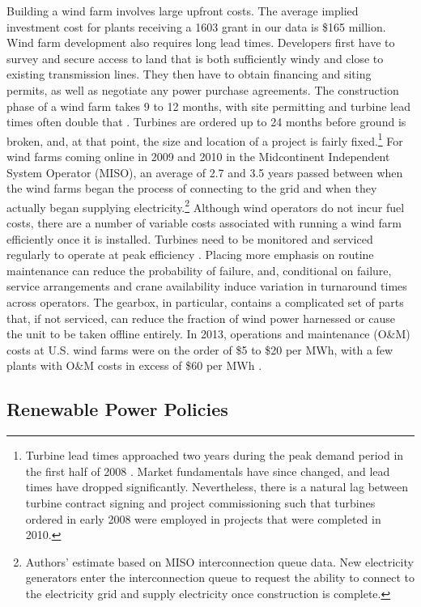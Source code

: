 \documentclass[12pt]{article}
\begin{document}
Building a wind farm involves large upfront costs. The average implied investment cost for plants receiving a 1603 grant in our data is \$165 million. Wind farm development also requires long lead times. Developers first have to survey and secure access to land that is both sufficiently windy and close to existing transmission lines. They then have to obtain financing and siting permits, as well as negotiate any power purchase agreements. The construction phase of a wind farm takes 9 to 12 months, with site permitting and turbine lead times often double that \citep{brown_arra_2011}. Turbines are ordered up to 24 months before ground is broken, and, at that point, the size and location of a project is fairly fixed.\footnote{Turbine lead times approached two years during the peak demand period in the first half of 2008 \citep[p. 12]{lantz_iea_2012}. Market fundamentals have since changed, and lead times have dropped significantly. Nevertheless, there is a natural lag between turbine contract signing and project commissioning such that turbines ordered in early 2008 were employed in projects that were completed in 2010.} For wind farms coming online in 2009 and 2010 in the Midcontinent Independent System Operator (MISO), an average of 2.7 and 3.5 years passed between when the wind farms began the process of connecting to the grid and when they actually began supplying electricity.\footnote{Authors' estimate based on MISO interconnection queue data. New electricity generators enter the interconnection queue to request the ability to connect to the electricity grid and supply electricity once construction is complete.}
Although wind operators do not incur fuel costs, there are a number of variable costs associated with running a wind farm efficiently once it is installed. Turbines need to be monitored and serviced regularly to operate at peak efficiency \citep{wiser_2013_2014}. Placing more emphasis on routine maintenance can reduce the probability of failure, and, conditional on failure, service arrangements and crane availability induce variation in turnaround times across operators. The gearbox, in particular, contains a complicated set of parts that, if not serviced, can reduce the fraction of wind power harnessed or cause the unit to be taken offline entirely. In 2013, operations and maintenance (O\&M) costs at U.S. wind farms were on the order of \$5 to \$20 per MWh, with a few plants with O\&M costs in excess of \$60 per MWh \citep{wiser_2013_2014}.

\subsection{Renewable Power Policies \label{subsec:RenewablePolicies}}
\end{document}
